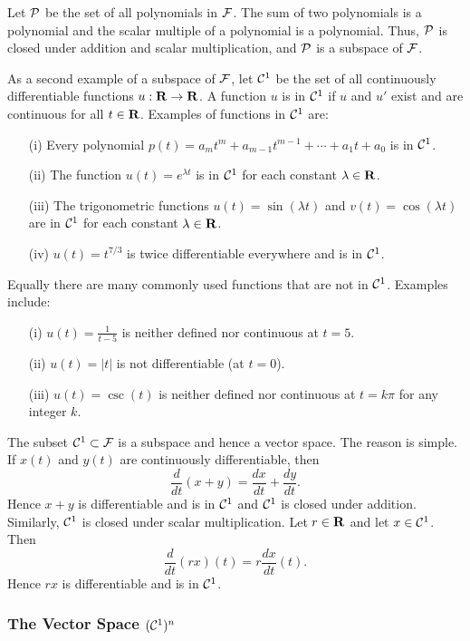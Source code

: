 Let ${\cal P}$ be the set of all polynomials in ${\cal F}$.  The sum of
two polynomials is a polynomial and the scalar multiple of a polynomial is a
polynomial.  Thus, ${\cal P}$ is closed under addition and scalar
multiplication, and ${\cal P}$ is a subspace of ${\cal F}$.

As a second example of a subspace of ${\cal F}$, let ${\cal C}^1$ be the set of
all continuously differentiable functions $u:\mbox{$\bf{R}$}\to\mbox{$\bf{R}$}$.  A function $u$ is
in ${\cal C}^1$ if $u$ and $u'$ exist and are continuous for all $t\in\mbox{$\bf{R}$}$.
Examples of functions in ${\cal C}^1$ are:
\begin{enumerate}
\item[(i)] Every polynomial $p(t)=a_mt^m+a_{m-1}t^{m-1}+\cdots
+a_1t+a_0$ is in ${\cal C}^1$. 
\item[(ii)]  The function $u(t)=e^{\lambda t}$ is in ${\cal C}^1$
for each constant $\lambda\in\mbox{$\bf{R}$}$.
\item[(iii)]  The trigonometric functions $u(t)=\sin(\lambda t)$
and $v(t)=\cos(\lambda t)$ are in ${\cal C}^1$ for each constant
$\lambda\in\mbox{$\bf{R}$}$. 
\item[(iv)] $u(t)=t^{7/3}$ is twice differentiable everywhere and is
in ${\cal C}^1$.
\end{enumerate}
Equally there are many commonly used functions that are not in
${\cal C}^1$.  Examples include:
\begin{enumerate}
\item[(i)] $u(t)=\frac{1}{t-5}$ is neither defined nor
continuous at $t=5$.
\item[(ii)] $u(t)=|t|$ is not differentiable (at $t=0$).
\item[(iii)] $u(t)=\csc(t)$ is neither defined nor continuous at
$t=k\pi$ for any integer $k$.
\end{enumerate}

The subset ${\cal C}^1\subset{\cal F}$  is a subspace and hence a vector space.
The reason is simple.  If $x(t)$ and $y(t)$ are continuously differentiable,
then
\[
\frac{d}{dt}(x+y) = \frac{dx}{dt}+\frac{dy}{dt}.
\]
Hence $x+y$ is differentiable and is in ${\cal C}^1$ and ${\cal C}^1$ is closed under
addition.  Similarly, ${\cal C}^1$ is closed under scalar multiplication.  Let
$r\in\mbox{$\bf{R}$}$ and let $x\in{\cal C}^1$. Then
\[
\frac{d}{dt}(rx)(t) = r\frac{dx}{dt}(t).
\]
Hence $rx$ is differentiable and is in ${\cal C}^1$.

\subsubsection*{The Vector Space $({\cal C}^1)^n$}

